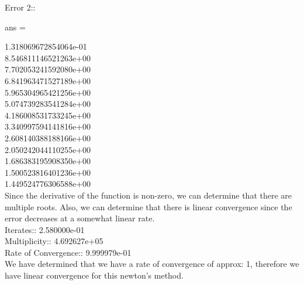 \documentclass[12pt]{article}
\begin{document}
\begin{enumerate}
\begin{framed}
Error 2::

ans =

     1.318069672854064e-01\\
     8.546811146521263e+00\\
     7.702053241592080e+00\\
     6.841963471527189e+00\\
     5.965304965421256e+00\\
     5.074739283541284e+00\\
     4.186008531733245e+00\\
     3.340997594141816e+00\\
     2.608140388188166e+00\\
     2.050242044110255e+00\\
     1.686383195908350e+00\\
     1.500523816401236e+00\\
     1.449524776306588e+00\\

Since the derivative of the function is non-zero, we can determine that there are multiple roots. Also, we can determine that there is linear convergence since the error decreases at a somewhat linear rate.\\
Iterates:: 2.580000e-01\\
Multiplicity:: 4.692627e+05\\
Rate of Convergence:: 9.999979e-01\\
We have determined that we have a rate of convergence of approx: 1, therefore we have linear convergence for this newton's method.
	\end{framed}
	\end{enumerate}

	\pagebreak
\end{document}
